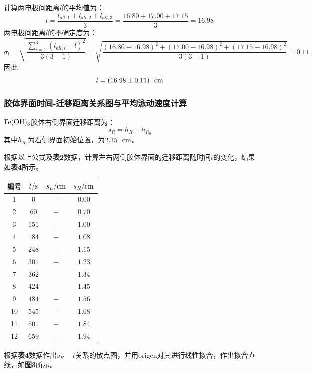 \documentclass[12pt]{article}
\begin{document}
		\par
		计算两电极间距离$l$的平均值为：
		$$
		l = \frac{l_{all,1}+l_{all,2}+l_{all,3}}{3} = \frac{16.80+17.00+17.15}{3} = 16.98 
		$$
		两电极间距离$l$的不确定度为：
		$$
		\sigma_{l} = \sqrt{\frac{\sum_{i=1}^{3}(l_{all,i}-l)^{2}}{3(3-1)}} = \sqrt{\frac{(16.80-16.98)^{2}+(17.00-16.98)^{2}+(17.15-16.98)^{2}}{3(3-1)}} = 0.11
		$$
		因此
		$$
		l = (16.98\pm0.11)\ \ \rm cm
		$$
		\subsubsection{胶体界面时间-迁移距离关系图与平均泳动速度计算}
		$\rm Fe(OH)_{3}$胶体右侧界面迁移距离为：
		$$
		s_{R}=h_{R}-h_{R_{0}}
		$$
		其中$h_{R_{0}}$为右侧界面初始位置，为$2.15\ \ \rm cm$。\par
		根据以上公式及\textbf{表2}数据，计算左右两侧胶体界面的迁移距离随时间$t$的变化，结果如\textbf{表4}所示。
		\begin{table}[h]
			\centering
			\begin{tabular}{cccc}
				\toprule
				编号 & $t/{\rm s}$ & $s_{L}/{\rm cm}$ & $s_{R}/{\rm cm}$  \\
				\midrule
				1 & $0$ & $-$ & $0.00$  \\
				2 & $60$ & $-$ & $0.70$  \\
				3 & $151$ & $-$ & $1.00$  \\
				4 & $184$ & $-$ & $1.08$  \\
				5 & $248$ & $-$ & $1.15$  \\
				6 & $301$ & $-$ & $1.23$  \\
				7 & $362$ & $-$ & $1.34$  \\
				8 & $424$ & $-$ & $1.45$  \\
				9 & $484$ & $-$ & $1.56$  \\
				10 &$545$ & $-$ & $1.68$  \\
				11 &$601$ & $-$ & $1.84$  \\
				12 &$659$ & $-$ & $1.94$  \\
				\bottomrule
			\end{tabular}
		\end{table}
		\par
		根据\textbf{表4}数据作出$s_{R}-t$关系的散点图，并用origen对其进行线性拟合，作出拟合直线，如\textbf{图3}所示。
\end{document}
